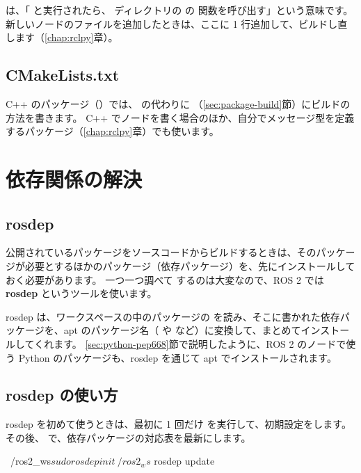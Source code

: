  は、「 と実行されたら、 ディレクトリの  の  関数を呼び出す」という意味です。
新しいノードのファイルを追加したときは、ここに 1 行追加して、ビルドし直します（\ref{chap:rclpy}章）。

\subsection{CMakeLists.txt}

C++ のパッケージ（）では、 の代わりに （\ref{sec:package-build}節）にビルドの方法を書きます。
C++ でノードを書く場合のほか、自分でメッセージ型を定義するパッケージ（\ref{chap:rclpy}章）でも使います。

\section{依存関係の解決}
\label{sec:workspace-rosdep}

\subsection{rosdep}

公開されているパッケージをソースコードからビルドするときは、そのパッケージが必要とするほかのパッケージ（依存パッケージ）を、先にインストールしておく必要があります。
一つ一つ調べて  するのは大変なので、ROS 2 では \textbf{rosdep} というツールを使います。

rosdep は、ワークスペースの中のパッケージの  を読み、そこに書かれた依存パッケージを、apt のパッケージ名（ や  など）に変換して、まとめてインストールしてくれます。
\ref{sec:python-pep668}節で説明したように、ROS 2 のノードで使う Python のパッケージも、rosdep を通じて apt でインストールされます。

\subsection{rosdep の使い方}

rosdep を初めて使うときは、最初に 1 回だけ  を実行して、初期設定をします。
その後、 で、依存パッケージの対応表を最新にします。

\begin{terminal}
~/ros2_ws$ sudo rosdep init
~/ros2_ws$ rosdep update
\end{terminal}

